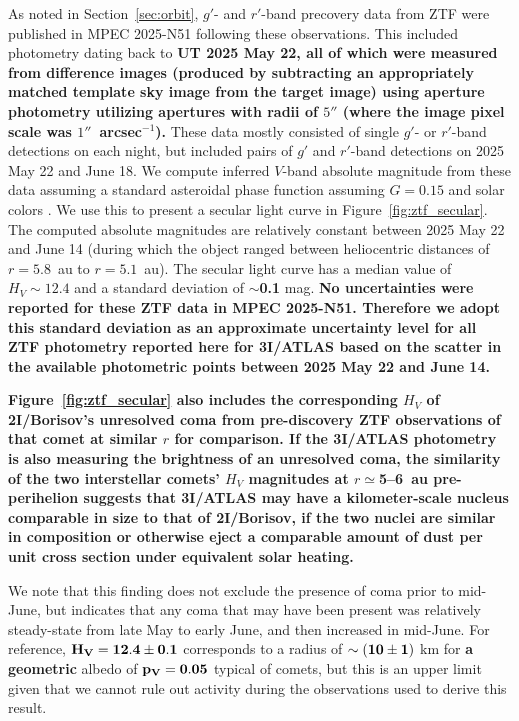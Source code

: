 \documentclass[linenumbers,twocolumn,longbib]{aastex7}
\begin{document}
As noted in Section~\ref{sec:orbit},  $g'$- and $r'$-band precovery data from ZTF were published in MPEC 2025-N51 following these observations. This included photometry dating back to \textbf{UT 2025 May 22, all of which were measured from difference images (produced by subtracting an appropriately matched template sky image from the target image) using aperture photometry utilizing apertures with radii of $5''$ (where the image pixel scale was $1''$~arcsec$^{-1}$).} These data mostly consisted of single $g'$- or $r'$-band detections on each night, but included pairs of $g'$ and $r'$-band detections on 2025 May 22 and June 18. We compute inferred $V$-band absolute magnitude from these data  assuming a standard asteroidal phase function \citep{bowell1989_astphotmodels_ast2} assuming $G=0.15$ and solar colors \citep{jordi2006_filtertransformations,holmberg2006_solarcolors}. We use this to present a secular light curve  in Figure~\ref{fig:ztf_secular}. The computed absolute magnitudes are relatively constant between 2025 May 22 and June 14 (during which the object ranged between heliocentric distances of $r=5.8$~au to $r=5.1$~au). The secular light curve has a median value of $H_V\sim12.4$ and a standard deviation of {\bf $\sim$0.1} mag.
\textbf{No uncertainties were reported for these ZTF data in MPEC 2025-N51. Therefore we  adopt this standard deviation as an approximate uncertainty level for all ZTF photometry reported here for 3I/ATLAS based on the scatter in the available photometric points between 2025 May 22 and June 14.}

\textbf{Figure~\ref{fig:ztf_secular} also includes the corresponding $H_V$ of 2I/Borisov's unresolved coma from pre-discovery ZTF observations of that comet \citep{ye2020_borisov} at similar $r$ for comparison. If the 3I/ATLAS photometry is also measuring the brightness of an unresolved coma, the similarity of the two interstellar comets' $H_V$ magnitudes at $r\simeq$5--6~au pre-perihelion suggests that 3I/ATLAS may have a kilometer-scale nucleus comparable in size to that of 2I/Borisov, if the two nuclei are similar in composition or otherwise eject a comparable amount of dust per unit cross section under equivalent solar heating.}

We note that this finding does not exclude the presence of coma prior to mid-June, but indicates that any coma that may have been present was relatively steady-state from late May to early June, and then increased in mid-June. For reference, ${\bf H_V=12.4\pm0.1}$ corresponds to a radius of ${\bf \sim(10\pm1)}$ km for {\bf a geometric} albedo of ${\bf p_V=0.05}$ typical of comets, but this is an upper limit given that we cannot rule out activity during the observations used to derive this result.
\end{document}
